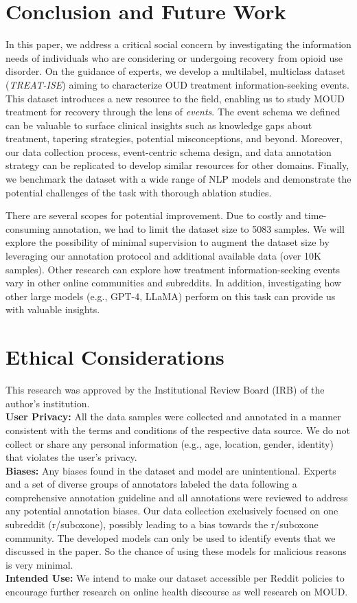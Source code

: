 \documentclass[letterpaper]{article}
\begin{document}
\section{Conclusion and Future Work}
In this paper, we address a critical social concern by investigating the information needs of individuals who are considering or undergoing recovery from opioid use disorder. On the guidance of experts, we develop a multilabel, multiclass dataset (\textit{TREAT-ISE}) aiming to characterize OUD treatment information-seeking events. This dataset introduces a new resource to the field, enabling us to study MOUD treatment for recovery through the lens of \textit{events}. The event schema we defined can be valuable to surface clinical insights such as knowledge gaps about treatment, tapering strategies, potential misconceptions, and beyond. Moreover, our data collection process, event-centric schema design, and data annotation strategy can be replicated to develop similar resources for other domains. Finally, we benchmark the dataset with a wide range of NLP models and demonstrate the potential challenges of the task with thorough ablation studies.

There are several scopes for potential improvement.
Due to costly and time-consuming annotation, we had to limit the dataset size to 5083 samples. We will explore the possibility of minimal supervision to augment the dataset size by leveraging our annotation protocol and additional available data (over 10K samples). Other research can explore how treatment information-seeking events vary in other online communities and subreddits. In addition, investigating how other large models (e.g., GPT-4, LLaMA) perform on this task can provide us with valuable insights.

\section{Ethical Considerations}
This research was approved by the Institutional Review Board (IRB) of the author's institution.
\\
\textbf{User Privacy:} All the data samples were collected and annotated in a manner consistent with the terms and conditions of the respective data source. We do not collect or share any personal information (e.g., age, location, gender, identity) that violates the user's privacy.
\\
\textbf{Biases:} Any biases found in the dataset and model are unintentional. Experts and a set of diverse groups of annotators labeled the data following a comprehensive annotation guideline and all annotations were reviewed to address any potential annotation biases. Our data collection exclusively focused on one subreddit (r/suboxone), possibly leading to a bias towards the r/suboxone community. The developed models can only be used to identify events that we
discussed in the paper. So the chance of using these models
for malicious reasons is very minimal.
\\
\textbf{Intended Use:} We intend to make our dataset accessible per Reddit policies to encourage further research on online health discourse as well research on MOUD.
\end{document}
